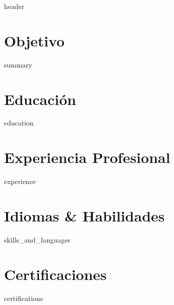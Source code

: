 \documentclass[10pt, letterpaper]{article}
\begin{document}
{{ header }}


\section*{Objetivo}
{{ summary }}


\section*{Educación}
{{ education }}


\section*{Experiencia Profesional}
{{ experience }}


\section*{Idiomas \& Habilidades}
{{ skills_and_languages }}


\section*{Certificaciones}
{{ certifications }}
\end{document}
